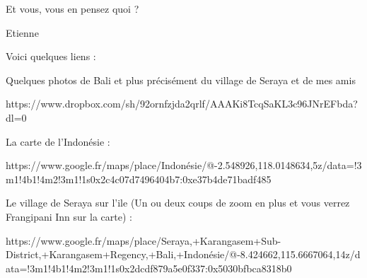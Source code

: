 Et vous, vous en pensez quoi ?

Etienne

Voici quelques liens :

Quelques photos de Bali et plus précisément du village de Seraya et de mes amis

https://www.dropbox.com/sh/92ornfzjda2qrlf/AAAKi8TcqSaKL3c96JNrEFbda?dl=0

La carte de l’Indonésie :

https://www.google.fr/maps/place/Indonésie/@-2.548926,118.0148634,5z/data=!3m1!4b1!4m2!3m1!1s0x2c4c07d7496404b7:0xe37b4de71badf485

Le village de Seraya sur l’ile (Un ou deux coups de zoom en plus et vous verrez Frangipani Inn sur la carte) :

https://www.google.fr/maps/place/Seraya,+Karangasem+Sub-District,+Karangasem+Regency,+Bali,+Indonésie/@-8.424662,115.6667064,14z/data=!3m1!4b1!4m2!3m1!1s0x2dcdf879a5e0f337:0x5030bfbca8318b0
